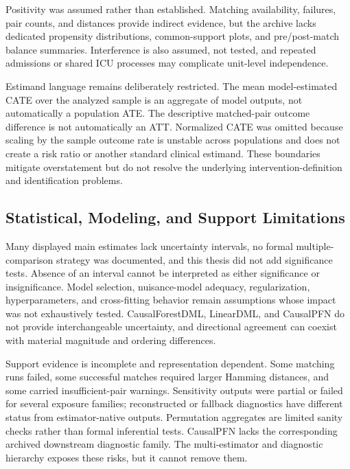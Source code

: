 Positivity was assumed rather than established.  Matching availability, failures, pair counts, and distances provide indirect evidence, but the archive lacks dedicated propensity distributions, common-support plots, and pre/post-match balance summaries.  Interference is also assumed, not tested, and repeated admissions or shared ICU processes may complicate unit-level independence.

Estimand language remains deliberately restricted.  The mean model-estimated CATE over the analyzed sample is an aggregate of model outputs, not automatically a population ATE.  The descriptive matched-pair outcome difference is not automatically an ATT.  Normalized CATE was omitted because scaling by the sample outcome rate is unstable across populations and does not create a risk ratio or another standard clinical estimand.  These boundaries mitigate overstatement but do not resolve the underlying intervention-definition and identification problems.

\subsection{Statistical, Modeling, and Support Limitations}
\label{subsec:discussion:statistical-modeling-support}

Many displayed main estimates lack uncertainty intervals, no formal multiple-comparison strategy was documented, and this thesis did not add significance tests.  Absence of an interval cannot be interpreted as either significance or insignificance.  Model selection, nuisance-model adequacy, regularization, hyperparameters, and cross-fitting behavior remain assumptions whose impact was not exhaustively tested.  CausalForestDML, LinearDML, and CausalPFN do not provide interchangeable uncertainty, and directional agreement can coexist with material magnitude and ordering differences.

Support evidence is incomplete and representation dependent.  Some matching runs failed, some successful matches required larger Hamming distances, and some carried insufficient-pair warnings.  Sensitivity outputs were partial or failed for several exposure families; reconstructed or fallback diagnostics have different status from estimator-native outputs.  Permutation aggregates are limited sanity checks rather than formal inferential tests.  CausalPFN lacks the corresponding archived downstream diagnostic family.  The multi-estimator and diagnostic hierarchy exposes these risks, but it cannot remove them.

